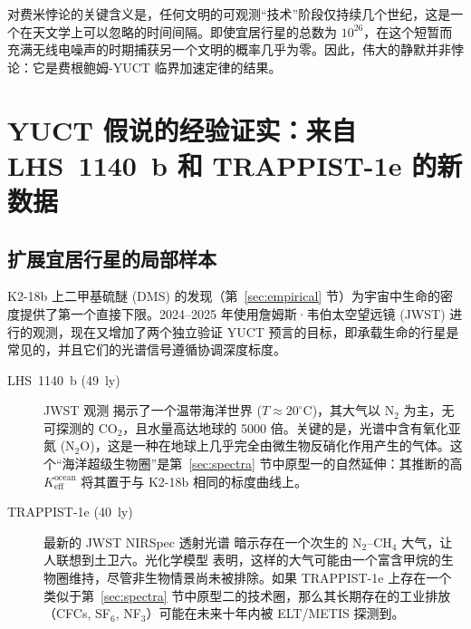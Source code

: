 \documentclass[11pt,a4paper]{article}
\begin{document}
	对费米悖论的关键含义是，任何文明的可观测“技术”阶段仅持续几个世纪，这是一个在天文学上可以忽略的时间间隔。即使宜居行星的总数为 \(10^{26}\)，在这个短暂而充满无线电噪声的时期捕获另一个文明的概率几乎为零。因此，伟大的静默并非悖论：它是费根鲍姆-YUCT 临界加速定律的结果。
	
	\section{YUCT 假说的经验证实：来自 LHS~1140~b 和 TRAPPIST-1e 的新数据}
	\label{sec:confirmation}
	
	\subsection{扩展宜居行星的局部样本}
	K2-18b 上二甲基硫醚 (DMS) 的发现（第~\ref{sec:empirical} 节）为宇宙中生命的密度提供了第一个直接下限。2024–2025 年使用詹姆斯·韦伯太空望远镜 (JWST) 进行的观测，现在又增加了两个独立验证 YUCT 预言的目标，即承载生命的行星是常见的，并且它们的光谱信号遵循协调深度标度。
	
	\begin{description}
		\item[LHS~1140~b (49~ly)] JWST 观测 \citep{Damiano2025} 揭示了一个温带海洋世界 (\(T\approx 20^{\circ}\mathrm{C}\))，其大气以 N$_2$ 为主，无可探测的 CO$_2$，且水量高达地球的 5000 倍。关键的是，光谱中含有氧化亚氮 (N$_2$O)，这是一种在地球上几乎完全由微生物反硝化作用产生的气体。这个“海洋超级生物圈”是第~\ref{sec:spectra} 节中原型一的自然延伸：其推断的高 \(K_{\mathrm{eff}}^{\mathrm{ocean}}\) 将其置于与 K2-18b 相同的标度曲线上。
		\item[TRAPPIST-1e (40~ly)] 最新的 JWST NIRSpec 透射光谱 \citep{Glidden2025} 暗示存在一个次生的 N$_2$–CH$_4$ 大气，让人联想到土卫六。光化学模型 \citep{EagerNash2025} 表明，这样的大气可能由一个富含甲烷的生物圈维持，尽管非生物情景尚未被排除。如果 TRAPPIST-1e 上存在一个类似于第~\ref{sec:spectra} 节中原型二的技术圈，那么其长期存在的工业排放（CFCs, SF$_6$, NF$_3$）可能在未来十年内被 ELT/METIS 探测到。
	\end{description}
	
\end{document}
